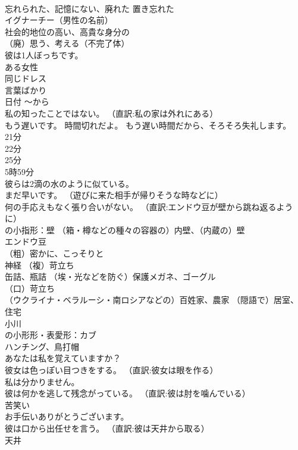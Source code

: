 \documentclass[8pt]{extreport}
\begin{document}
\begin{CJK}{UTF8}{min}
\\	忘れられた、記憶にない、廃れた 置き忘れた
\\	イグナーチー（男性の名前）
\\	社会的地位の高い、高貴な身分の
\\	（廃）思う、考える（不完了体）
\\	彼は1人ぼっちです。
\\	ある女性
\\	同じドレス
\\	言葉ばかり
\\	日付	〜から
\\	私の知ったことではない。 （直訳:私の家は外れにある）
\\	もう遅いです。 時間切れだよ。 もう遅い時間だから、そろそろ失礼します。
\\	21分
\\	22分
\\	25分
\\	5時59分
\\	彼らは2滴の水のように似ている。
\\	まだ早いです。 （遊びに来た相手が帰りそうな時などに）
\\	何の手応えもなく張り合いがない。 （直訳:エンドウ豆が壁から跳ね返るように）
\\	の小指形：壁 （箱・樽などの種々の容器の）内壁、（内蔵の）壁
\\	[集合]エンドウ豆
\\	（粗）密かに、こっそりと
\\	神経 （複）苛立ち
\\	缶詰、瓶詰 （埃・光などを防ぐ）保護メガネ、ゴーグル
\\	（口）苛立ち
\\	（ウクライナ・ベラルーシ・南ロシアなどの）百姓家、農家 （隠語で）居室、住宅
\\	小川
\\	の小形形・表愛形：カブ
\\	ハンチング、鳥打帽
\\	あなたは私を覚えていますか？
\\	彼女は色っぽい目つきをする。 （直訳:彼女は眼を作る）
\\	私は分かりません。
\\	彼は何かを逃して残念がっている。 （直訳:彼は肘を噛んでいる）
\\	苦笑い
\\	お手伝いありがとうございます。
\\	彼は口から出任せを言う。 （直訳:彼は天井から取る）
\\	天井

\end{CJK}
\end{document}
